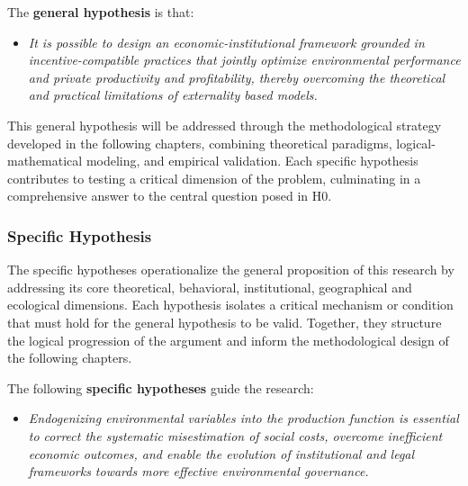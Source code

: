 \vspace{1em}

The \textbf{general hypothesis} is that: 

\begin{itemize} 

    \item[\textbf{H0.}] 
    
    \textit{It is possible to design an economic-institutional framework grounded in incentive-compatible practices that jointly optimize environmental performance and private productivity and profitability, thereby overcoming the theoretical and practical limitations of externality based models.}
    
\end{itemize}

This general hypothesis will be addressed through the methodological strategy developed in the following chapters, combining theoretical paradigms, logical-mathematical modeling, and empirical validation. Each specific hypothesis contributes to testing a critical dimension of the problem, culminating in a comprehensive answer to the central question posed in H0.

\subsubsection{Specific Hypothesis}

The specific hypotheses operationalize the general proposition of this research by addressing its core theoretical, behavioral, institutional, geographical and ecological dimensions. Each hypothesis isolates a critical mechanism or condition that must hold for the general hypothesis to be valid. Together, they structure the logical progression of the argument and inform the methodological design of the following chapters.

\vspace{1em}

The following \textbf{specific hypotheses} guide the research:

\begin{itemize} 

    \item[\textbf{H1.}] 
    
    \textit{Endogenizing environmental variables into the production function is essential to correct the systematic misestimation of social costs, overcome inefficient economic outcomes, and enable the evolution of institutional and legal frameworks towards more effective environmental governance.}
    
\end{itemize}

